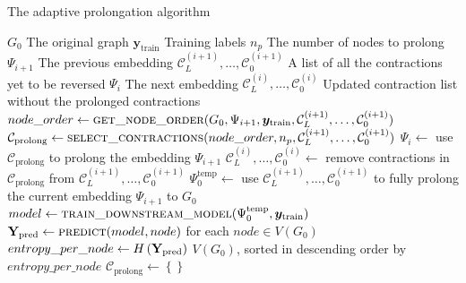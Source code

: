 

\usepackage{algorithm}
\usepackage{algpseudocode}



\begin{algorithm*}
  \caption{The adaptive prolongation algorithm}
  \begin{algorithmic}
    \Require $ G_0 $ \Comment The original graph
    \Require $ \bm{y}_\mathrm{train} $ \Comment Training labels
    \Require $ n_p $ \Comment The number of nodes to prolong
    \Require $ \Psi_{i + 1} $ \Comment The previous embedding
    \Require $ \mathcal{C}_L^{(i + 1)}, \dots, \mathcal{C}_0^{(i + 1)} $ \Comment A list of all the contractions yet to be reversed
    \Ensure $ \Psi_i $ \Comment The next embedding
    \Ensure $ \mathcal{C}_L^{(i)}, \dots, \mathcal{C}_0^{(i)} $ \Comment Updated contraction list without the prolonged contractions
    \Statex
    \State $ node\_order \gets \Call{get\_node\_order}{G_0, \Psi_{i+1}, \bm{y}_\mathrm{train}, \mathcal{C}_L^{(i + 1)}, \dots, \mathcal{C}_0^{(i + 1)}} $
    \State $ \mathcal{C}_\mathrm{prolong} \gets \Call{select\_contractions}{node\_order, n_p, \mathcal{C}_L^{(i + 1)}, \dots, \mathcal{C}_0^{(i + 1)}} $
    \State $ \Psi_i \gets $ use $ \mathcal{C}_\mathrm{prolong} $ to prolong the embedding $ \Psi_{i + 1} $
    \State $ \mathcal{C}_L^{(i)}, \dots, \mathcal{C}_0^{(i)} \gets $ remove contractions in $ \mathcal{C}_\mathrm{prolong} $ from $ \mathcal{C}_L^{(i + 1)}, \dots, \mathcal{C}_0^{(i + 1)} $
    \Statex
        \State $ \Psi_0^\mathrm{temp} \gets $ use $ \mathcal{C}_L^{(i + 1)}, \dots, \mathcal{C}_0^{(i + 1)} $ to fully prolong the current embedding $ \Psi_{i+1} $ to $ G_0 $
        \State $ model \gets \Call{train\_downstream\_model}{\Psi_0^\mathrm{temp}, \bm{y}_\mathrm{train}} $
        \State $ \mathmat{Y}_\mathrm{pred} \gets \Call{predict}{model, node} $ for each $ node \in V \left( G_0 \right) $
        \State $ entropy\_per\_node \gets H \left( \mathbf{Y}_\mathrm{pred} \right) $
        \State \Return $ V \left( G_0 \right) $, sorted in descending order by $ entropy\_per\_node $
    \EndFunction
    \Statex
        \State $ \mathcal{C}_\mathrm{prolong} \gets \left\{ \right\} $

\end{algorithmic}
\end{algorithm*}
